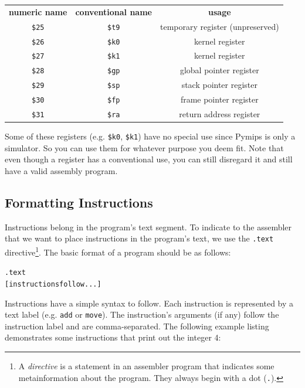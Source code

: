 \documentclass[12pt]{article}
\begin{document}
\begin{tabular}{c | c | c}
\textbf{numeric name} & \textbf{conventional name} & \textbf{usage}\\
    \hhline{=|=|=}
    \texttt{\$25} & \texttt{\$t9} & temporary register (unpreserved) \\ \hline
    \texttt{\$26} & \texttt{\$k0} & kernel register \\ \hline
    \texttt{\$27} & \texttt{\$k1} & kernel register \\ \hline
    \texttt{\$28} & \texttt{\$gp} & global pointer register \\ \hline
    \texttt{\$29} & \texttt{\$sp} & stack pointer register \\ \hline
    \texttt{\$30} & \texttt{\$fp} & frame pointer register \\ \hline
    \texttt{\$31} & \texttt{\$ra} & return address register \\ \hline
\end{tabular}

\vspace{0.1in} Some of these registers (e.g. \texttt{\$k0}, \texttt{\$k1}) have
     no special use since Pymips is only a simulator. So you can use them for
     whatever purpose you deem fit. Note that even though a register has a
     conventional use, you can still disregard it and still have a valid
     assembly program.

\subsection{Formatting Instructions}

Instructions belong in the program's text segment. To indicate to the assembler
     that we want to place instructions in the program's text, we use the
     \texttt{.text} directive\footnote{A \textit{directive} is a statement in an
     assembler program that indicates some metainformation about the
     program. They always begin with a dot (\texttt{.}).}. The basic format of a
     program should be as follows:

\begin{alltt}
    .text
    [instructions follow...]
\end{alltt}

Instructions have a simple syntax to follow. Each instruction is represented by
     a text label (e.g. \texttt{add} or \texttt{move}). The instruction's
     arguments (if any) follow the instruction label and are
     comma-separated. The following example listing demonstrates some
     instructions that print out the integer 4:
\end{document}
